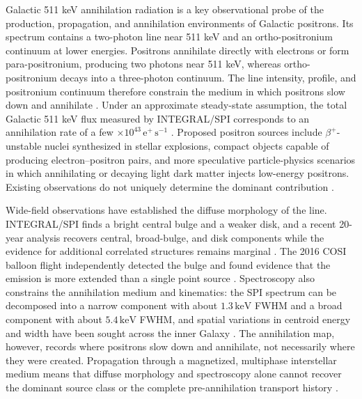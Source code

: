 \documentclass[11pt]{article}
\newcommand{\keV}{\ensuremath{\,\mathrm{keV}}}
\begin{document}
Galactic 511 keV annihilation radiation is a key observational probe of the
production, propagation, and annihilation environments of Galactic positrons.
Its spectrum contains a two-photon line near 511 keV and an ortho-positronium
continuum at lower energies. Positrons annihilate directly with electrons or
form para-positronium, producing two photons near 511 keV, whereas
ortho-positronium decays into a three-photon continuum. The line intensity,
profile, and positronium continuum therefore constrain the medium in which
positrons slow down and annihilate \cite{Prantzos2011,Jean2006}. Under an
approximate steady-state assumption, the total Galactic 511 keV flux measured
by INTEGRAL/SPI corresponds to an annihilation rate of a few
$\times10^{43}\,\mathrm{e^+\,s^{-1}}$ \cite{Prantzos2011,Kierans2020}. Proposed
positron sources include $\beta^+$-unstable nuclei synthesized in stellar
explosions, compact objects capable of producing electron--positron pairs, and
more speculative particle-physics scenarios in which annihilating or decaying
light dark matter injects low-energy positrons. Existing observations do not
uniquely determine the dominant contribution
\cite{Prantzos2011,Siegert2016AA,Siegert2016V404}.

Wide-field observations have established the diffuse morphology of the line.
INTEGRAL/SPI finds a bright central bulge and a weaker disk, and a recent
20-year analysis recovers central, broad-bulge, and disk components while the
evidence for additional correlated structures remains marginal
\cite{Knodlseder2005AllSky,Siegert2016AA,Yoneda2025}. The 2016 COSI balloon flight independently
detected the bulge and found evidence that the emission is more extended than a
single point source \cite{Kierans2020,Siegert2020COSI}. Spectroscopy also
constrains the annihilation medium and kinematics: the SPI spectrum can be
decomposed into a narrow component with about $1.3\keV$ FWHM and a broad
component with about $5.4\keV$ FWHM, and spatial variations in centroid energy
and width have been sought across the inner Galaxy
\cite{Jean2006,Siegert2019Kinematics}. The annihilation map, however, records
where positrons slow down and annihilate, not necessarily where they were
created. Propagation through a magnetized, multiphase interstellar medium means
that diffuse morphology and spectroscopy alone cannot recover the dominant
source class or the complete pre-annihilation transport history
\cite{Prantzos2011}.
\end{document}
